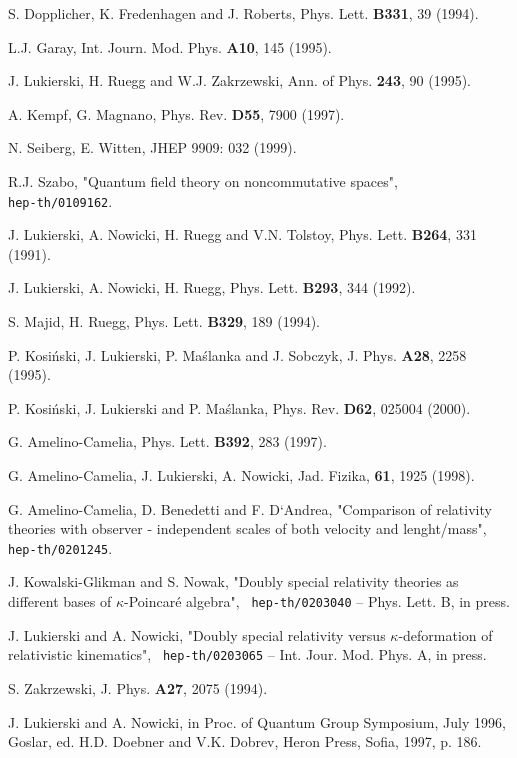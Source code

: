 \documentclass[a4paper,12pt]{article}
\begin{document}
\begin{thebibliography}{99}
S. Dopplicher, K. Fredenhagen and J. Roberts, Phys. Lett. {\bf
B331},  39 (1994).

L.J. Garay, Int. Journ. Mod. Phys. {\bf A10}, 145 (1995).

J. Lukierski, H. Ruegg and W.J. Zakrzewski, Ann. of Phys. {\bf
243}, 90 (1995).

A. Kempf, G. Magnano, Phys. Rev. {\bf D55}, 7900 (1997).

N. Seiberg, E. Witten, JHEP 9909: 032 (1999).

R.J. Szabo, "Quantum field theory on noncommutative spaces",
 \\{\tt hep-th/0109162}.

J. Lukierski, A. Nowicki,  H. Ruegg and V.N. Tolstoy,
  Phys. Lett. {\bf B264}, 331 (1991).

J. Lukierski, A. Nowicki,  H. Ruegg, Phys. Lett. {\bf B293}, 
         344 (1992).

S. Majid, H. Ruegg, Phys. Lett. {\bf B329}, 189 (1994).

P. Kosi\'{n}ski, J. Lukierski, P. Ma\'{s}lanka and J. Sobczyk, 
   J. Phys. {\bf A28}, 2258 (1995).

P. Kosi\'{n}ski, J. Lukierski and P. Ma\'{s}lanka, Phys. Rev. 
 {\bf D62}, 025004 (2000).

G. Amelino-Camelia, Phys. Lett. {\bf B392}, 283
(1997).

G. Amelino-Camelia, J. Lukierski, A. Nowicki, Jad. Fizika, 
{\bf 61}, 1925 (1998).

G. Amelino-Camelia, D. Benedetti and F. D`Andrea, 
"Comparison of relativity theories with observer - independent scales 
of both velocity and
lenght/mass", {\tt hep-th/0201245}.

J. Kowalski-Glikman and S. Nowak, "Doubly special 
relativity theories as
different bases of $\kappa$-Poincar\'{e} algebra", {\tt
hep-th/0203040} -- Phys. Lett. B, in press.


J. Lukierski and A. Nowicki, "Doubly special relativity versus
$\kappa$-deformation of relativistic kinematics", {\tt
hep-th/0203065} -- Int. Jour. Mod. Phys. A, in press.

S. Zakrzewski, J. Phys. {\bf A27}, 2075 (1994).

J. Lukierski and A. Nowicki,  in Proc. of Quantum Group
Symposium, July 1996, Goslar, ed. H.D. Doebner and V.K. Dobrev,
Heron Press, Sofia, 1997, p. 186.


\end{thebibliography}
\end{document}
